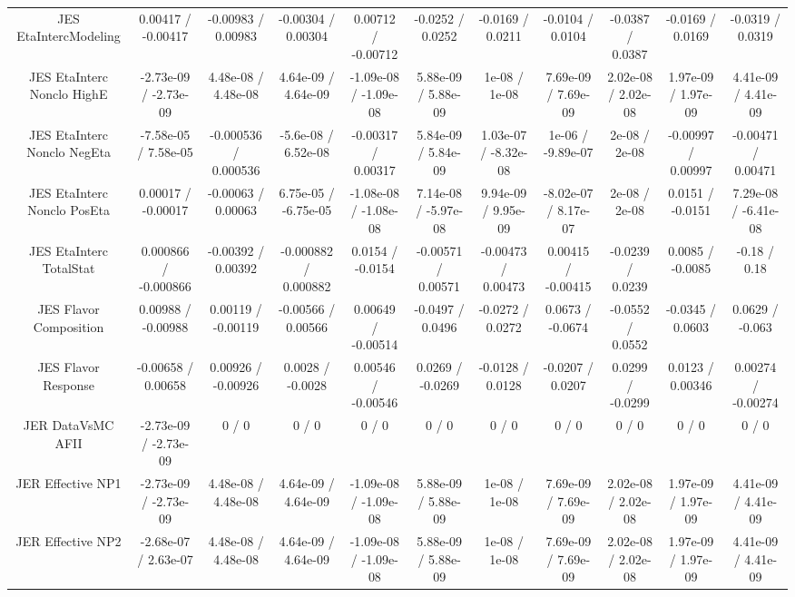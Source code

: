 {\begin{landscape}
\begin{longtable}{@{\extracolsep{\fill}}| *{11}{c|}}
  JES EtaIntercModeling & 0.00417 / -0.00417 & -0.00983 / 0.00983 & -0.00304 / 0.00304 & 0.00712 / -0.00712 & -0.0252 / 0.0252 & -0.0169 / 0.0211 & -0.0104 / 0.0104 & -0.0387 / 0.0387 & -0.0169 / 0.0169 & -0.0319 / 0.0319 \\ 
  JES EtaInterc Nonclo HighE & -2.73e-09 / -2.73e-09 & 4.48e-08 / 4.48e-08 & 4.64e-09 / 4.64e-09 & -1.09e-08 / -1.09e-08 & 5.88e-09 / 5.88e-09 & 1e-08 / 1e-08 & 7.69e-09 / 7.69e-09 & 2.02e-08 / 2.02e-08 & 1.97e-09 / 1.97e-09 & 4.41e-09 / 4.41e-09 \\ 
  JES EtaInterc Nonclo NegEta & -7.58e-05 / 7.58e-05 & -0.000536 / 0.000536 & -5.6e-08 / 6.52e-08 & -0.00317 / 0.00317 & 5.84e-09 / 5.84e-09 & 1.03e-07 / -8.32e-08 & 1e-06 / -9.89e-07 & 2e-08 / 2e-08 & -0.00997 / 0.00997 & -0.00471 / 0.00471 \\ 
  JES EtaInterc Nonclo PosEta & 0.00017 / -0.00017 & -0.00063 / 0.00063 & 6.75e-05 / -6.75e-05 & -1.08e-08 / -1.08e-08 & 7.14e-08 / -5.97e-08 & 9.94e-09 / 9.95e-09 & -8.02e-07 / 8.17e-07 & 2e-08 / 2e-08 & 0.0151 / -0.0151 & 7.29e-08 / -6.41e-08 \\ 
  JES EtaInterc TotalStat & 0.000866 / -0.000866 & -0.00392 / 0.00392 & -0.000882 / 0.000882 & 0.0154 / -0.0154 & -0.00571 / 0.00571 & -0.00473 / 0.00473 & 0.00415 / -0.00415 & -0.0239 / 0.0239 & 0.0085 / -0.0085 & -0.18 / 0.18 \\ 
  JES Flavor Composition & 0.00988 / -0.00988 & 0.00119 / -0.00119 & -0.00566 / 0.00566 & 0.00649 / -0.00514 & -0.0497 / 0.0496 & -0.0272 / 0.0272 & 0.0673 / -0.0674 & -0.0552 / 0.0552 & -0.0345 / 0.0603 & 0.0629 / -0.063 \\ 
  JES Flavor Response & -0.00658 / 0.00658 & 0.00926 / -0.00926 & 0.0028 / -0.0028 & 0.00546 / -0.00546 & 0.0269 / -0.0269 & -0.0128 / 0.0128 & -0.0207 / 0.0207 & 0.0299 / -0.0299 & 0.0123 / 0.00346 & 0.00274 / -0.00274 \\ 
  JER DataVsMC AFII & -2.73e-09 / -2.73e-09 & 0 / 0 & 0 / 0 & 0 / 0 & 0 / 0 & 0 / 0 & 0 / 0 & 0 / 0 & 0 / 0 & 0 / 0 \\ 
  JER Effective NP1 & -2.73e-09 / -2.73e-09 & 4.48e-08 / 4.48e-08 & 4.64e-09 / 4.64e-09 & -1.09e-08 / -1.09e-08 & 5.88e-09 / 5.88e-09 & 1e-08 / 1e-08 & 7.69e-09 / 7.69e-09 & 2.02e-08 / 2.02e-08 & 1.97e-09 / 1.97e-09 & 4.41e-09 / 4.41e-09 \\ 
  JER Effective NP2 & -2.68e-07 / 2.63e-07 & 4.48e-08 / 4.48e-08 & 4.64e-09 / 4.64e-09 & -1.09e-08 / -1.09e-08 & 5.88e-09 / 5.88e-09 & 1e-08 / 1e-08 & 7.69e-09 / 7.69e-09 & 2.02e-08 / 2.02e-08 & 1.97e-09 / 1.97e-09 & 4.41e-09 / 4.41e-09 \\ 

\end{longtable}
\end{landscape}}
